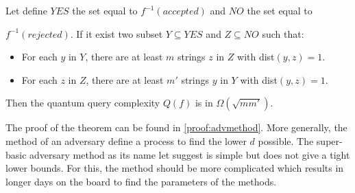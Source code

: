 \begin{theorem}
    Let define $YES$ the set equal to $f^{-1}(accepted)$ and $NO$ the set
    equal to

    $f^{-1}(rejected)$. If it exist two subset $Y\subseteq YES$ and
    $Z \subseteq NO$ such that:
    \begin{itemize}
        \item For each $y$ in $Y$, there are at least $m$ strings $z$ in $Z$ with dist$(y,z)=1$.
        \item For each $z$ in $Z$, there are at least $m'$ strings $y$ in $Y$ with dist$(y,z)=1$.
    \end{itemize}
    Then the quantum query complexity $Q(f)$ is in  $\Omega(\sqrt{m m'})$.
\end{theorem}

The proof of the theorem can be found in \autoref{proof:advmethod}. More generally,
the method of an adversary define a process to find the lower $d$ possible. The
super-basic adversary method as its name let suggest is simple but does not give
a tight lower bounds. For this, the method should be more complicated which results
in longer days on the board to find the parameters of the methods.

